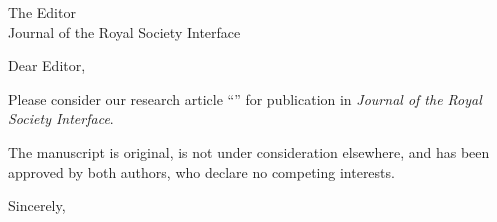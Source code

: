 \documentclass[11pt]{letter}
\begin{document}
\begin{letter}{The Editor\\Journal of the Royal Society Interface}
\opening{Dear Editor,}

Please consider our research article ``\TITLE'' for publication in \textit{Journal of the Royal Society Interface}.

The manuscript is original, is not under consideration elsewhere, and has been approved by both authors, who declare no competing interests.

\closing{Sincerely,}
\end{letter}
\end{document}
